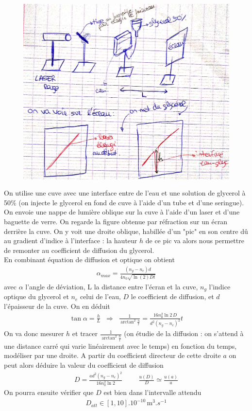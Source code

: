 \documentclass[12pt,prb,aps,epsf]{article}
\begin{document}
\begin{figure}[h]
	\centering \includegraphics[width=13cm]{schema_diffusion}
\end{figure}
On utilise une cuve avec une interface entre de l'eau et une solution de glycerol à 50\% (on injecte le glycerol en fond de cuve à l'aide d'un tube et d'une seringue). On envoie une nappe de lumière oblique sur la cuve à l'aide d'un laser et d'une baguette de verre. On regarde la figure obtenue par réfraction sur un écran derrière la cuve. On y voit une droite oblique, habillée d'un "pic" en son centre dû au gradient d'indice à l'interface : la hauteur $h$ de ce pic va alors nous permettre de remonter au coefficient de diffusion du glycerol.\\
En combinant équation de diffusion et optique on obtient 
\begin{eqnarray}
\alpha_{max} = \frac{(n_g-n_e)d}{4n_0\sqrt{\ln(2)Dt}}
\end{eqnarray}
avec $\alpha$ l'angle de déviation, L la distance entre l'écran et la cuve, $n_g$ l'indice optique du glycerol et $n_e$ celui de l'eau, $D$ le coefficient de diffusion, et $d$ l'épaisseur de la cuve. On en déduit 
\begin{eqnarray}
\tan \alpha = \frac{h}{L}\;\;\Rightarrow\;\; \frac{1}{\arctan^2{\frac{h}{l}}} = \frac{16n_0^2\ln2\,D}{d^2(n_g-n_e)^2}t
\end{eqnarray}
On va donc mesurer $h$ et tracer $\frac{1}{\arctan^2{\frac{h}{l}}}$ (on étudie de la diffusion : on s'attend à une distance carré qui varie linéairement avec le temps) en fonction du temps, modéliser par une droite. A partir du coefficient directeur de cette droite $a$ on peut alors déduire la valeur du coefficient de diffusion
\begin{eqnarray}
D = \frac{ad^2(n_g-n_e)^2}{16n_0^2\ln2}\hspace{1cm} \frac{u(D)}{D} \simeq \frac{u(a)}{a}
\end{eqnarray}
On pourra ensuite vérifier que $D$ est bien dans l'intervalle attendu 
\begin{eqnarray}
D_{att} \in [1,10].10^{-10}\,\mathrm{m}^3.s^{-1}
\end{eqnarray}
\end{document}
